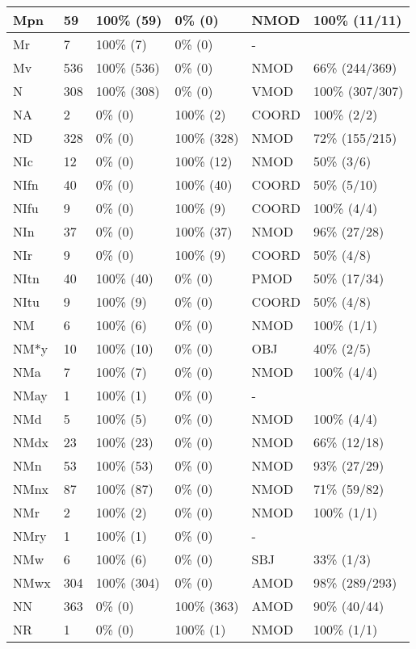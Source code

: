 \begin{figure*}
\begin{tabular}{|l|l|l|l||l|l|}
 Mpn & 59 & 100\% (59) & 0\% (0) & NMOD & 100\% (11/11) \\ 
\hline
 Mr & 7 & 100\% (7) & 0\% (0) & - &  \\ 
\hline
 Mv & 536 & 100\% (536) & 0\% (0) & NMOD & 66\% (244/369) \\ 
\hline
 N & 308 & 100\% (308) & 0\% (0) & VMOD & 100\% (307/307) \\ 
\hline
 NA & 2 & 0\% (0) & 100\% (2) & COORD & 100\% (2/2) \\ 
\hline
 ND & 328 & 0\% (0) & 100\% (328) & NMOD & 72\% (155/215) \\ 
\hline
 NIc & 12 & 0\% (0) & 100\% (12) & NMOD & 50\% (3/6) \\ 
\hline
 NIfn & 40 & 0\% (0) & 100\% (40) & COORD & 50\% (5/10) \\ 
\hline
 NIfu & 9 & 0\% (0) & 100\% (9) & COORD & 100\% (4/4) \\ 
\hline
 NIn & 37 & 0\% (0) & 100\% (37) & NMOD & 96\% (27/28) \\ 
\hline
 NIr & 9 & 0\% (0) & 100\% (9) & COORD & 50\% (4/8) \\ 
\hline
 NItn & 40 & 100\% (40) & 0\% (0) & PMOD & 50\% (17/34) \\ 
\hline
 NItu & 9 & 100\% (9) & 0\% (0) & COORD & 50\% (4/8) \\ 
\hline
 NM & 6 & 100\% (6) & 0\% (0) & NMOD & 100\% (1/1) \\ 
\hline
 NM*y & 10 & 100\% (10) & 0\% (0) & OBJ & 40\% (2/5) \\ 
\hline
 NMa & 7 & 100\% (7) & 0\% (0) & NMOD & 100\% (4/4) \\ 
\hline
 NMay & 1 & 100\% (1) & 0\% (0) & - &  \\ 
\hline
 NMd & 5 & 100\% (5) & 0\% (0) & NMOD & 100\% (4/4) \\ 
\hline
 NMdx & 23 & 100\% (23) & 0\% (0) & NMOD & 66\% (12/18) \\ 
\hline
 NMn & 53 & 100\% (53) & 0\% (0) & NMOD & 93\% (27/29) \\ 
\hline
 NMnx & 87 & 100\% (87) & 0\% (0) & NMOD & 71\% (59/82) \\ 
\hline
 NMr & 2 & 100\% (2) & 0\% (0) & NMOD & 100\% (1/1) \\ 
\hline
 NMry & 1 & 100\% (1) & 0\% (0) & - &  \\ 
\hline
 NMw & 6 & 100\% (6) & 0\% (0) & SBJ & 33\% (1/3) \\ 
\hline
 NMwx & 304 & 100\% (304) & 0\% (0) & AMOD & 98\% (289/293) \\ 
\hline
 NN & 363 & 0\% (0) & 100\% (363) & AMOD & 90\% (40/44) \\ 
\hline
 NR & 1 & 0\% (0) & 100\% (1) & NMOD & 100\% (1/1) \\ 
\hline
\end{tabular}
\end{figure*}
